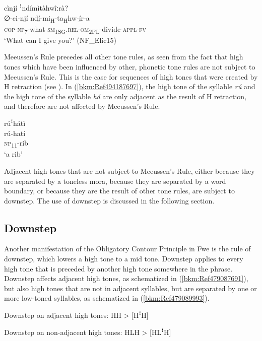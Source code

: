 \ea
\label{bkm:Ref98510009}
cìnjí ꜝndímìtàhwîːrà?\\
\gll ∅-ci-njí    ndí̲-mi\textsubscript{H}-ta\textsubscript{H}hw-í̲r-a\\
\textsc{cop}-\textsc{np}\textsubscript{7}-what  \textsc{sm}\textsubscript{1SG}.\textsc{rel}-\textsc{om}\textsubscript{2PL}-divide-\textsc{appl}-\textsc{fv}\\
\glt ‘What can I give you?’ (NF\_Elic15)
\z

Meeussen’s Rule precedes all other tone rules, as seen from the fact that high tones which have been influenced by other, phonetic tone rules are not subject to Meeussen’s Rule. This is the case for sequences of high tones that were created by H retraction (see ). In (\ref{bkm:Ref494187697}), the high tone of the syllable \textit{rú} and the high tone of the syllable \textit{há} are only adjacent as the result of H retraction, and therefore are not affected by Meeussen’s Rule.

\ea
\label{bkm:Ref494187697}
\glll rúꜝhátì\\
rú-hatí\\
\textsc{np}\textsubscript{11}-rib\\
\glt ‘a rib’
\z

Adjacent high tones that are not subject to Meeussen’s Rule, either because they are separated by a toneless mora, because they are separated by a word boundary, or because they are the result of other tone rules, are subject to downstep. The use of downstep is discussed in the following section.

\subsection{Downstep}
\label{bkm:Ref445296627}\hypertarget{Toc75352619}{}
Another manifestation of the Obligatory Contour Principle in Fwe is the rule of downstep, which lowers a high tone to a mid tone. Downstep applies to every high tone that is preceded by another high tone somewhere in the phrase. Downstep affects adjacent high tones, as schematized in (\ref{bkm:Ref479087691}), but also high tones that are not in adjacent syllables, but are separated by one or more low-toned syllables, as schematized in (\ref{bkm:Ref479089993}).

\ea
\label{bkm:Ref479087691}
  Downstep on adjacent high tones: HH > [HꜝH]
\z

\ea
\label{bkm:Ref479089993}
  Downstep on non-adjacent high tones: HLH > [HLꜝH]
\z

